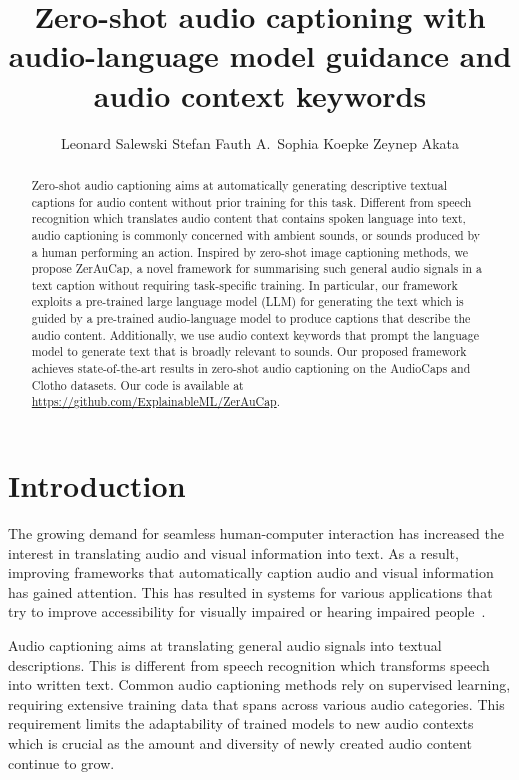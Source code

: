 \documentclass{article}
\title{Zero-shot audio captioning with audio-language model guidance and audio context keywords}
\author{Leonard Salewski
\And
  Stefan Fauth
\And
  A.\ Sophia Koepke
\And
  Zeynep Akata
\AND
  \vspace{-5mm}\\
  \affaddr{
University of Tübingen, Tübingen AI Center}\hspace{12pt}
}
\begin{document}
\maketitle


\begin{abstract}
    Zero-shot audio captioning aims at automatically generating descriptive textual captions for audio content without prior training for this task. Different from speech recognition which translates audio content that contains spoken language into text, audio captioning is commonly concerned with ambient sounds, or sounds produced by a human performing an action. Inspired by zero-shot image captioning methods, we propose ZerAuCap, a novel framework for summarising such general audio signals in a text caption without requiring task-specific training.
    In particular, our framework exploits a pre-trained large language model (LLM) for generating the text which is guided by a pre-trained audio-language model to produce captions that describe the audio content. Additionally, we use audio context keywords that prompt the language model to generate text that is broadly relevant to sounds.
    Our proposed framework achieves state-of-the-art results in zero-shot audio captioning on the AudioCaps and Clotho datasets. Our code is available at \url{https://github.com/ExplainableML/ZerAuCap}.
\end{abstract}


\section{Introduction}
The growing demand for seamless human-computer interaction has increased the interest in translating audio and visual information into text.
As a result, improving frameworks that automatically caption audio and visual information has gained attention. This has resulted in systems for various applications that try to improve accessibility for visually impaired or hearing impaired people~\cite{oncescu2021queryd,han2023autoad,han2023autoadiccv}.

Audio captioning aims at translating general audio signals into textual descriptions. This is different from speech recognition which transforms speech into written text. Common audio captioning methods rely on supervised learning, requiring extensive training data that spans across various audio categories. This requirement limits the adaptability of trained models to new audio contexts which is crucial as the amount and diversity of newly created audio content continue to grow.
\end{document}
